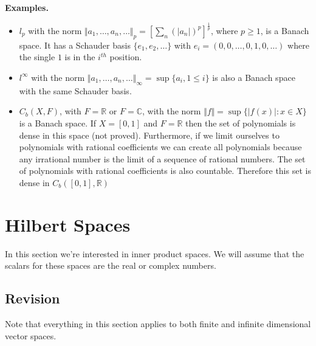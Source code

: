 \documentclass[two column]{article}
\begin{document}
{\bf Examples.}
\begin{itemize}
\item $l_{p}$ with the norm $\Vert a_{1}, \dots, a_{n}, \dots \Vert_{p} = [ \sum_{n} (\vert a_{n} \vert)^{p} ]^{\frac{1}{p}}$, where $p \geq 1$, is a Banach space. It has a Schauder basis $\{ e_{1}, e_{2}, \dots \}$ with $e_{i} = (0,0,\dots,0,1,0, \dots)$ where the single $1$ is in the $i^{th}$ position. 
\item $l^{\infty}$ with the norm $\Vert a_{1}, \dots, a_{n}, \dots \Vert_{\infty} = \sup \{a_{i}, 1 \leq i\}$ is also a Banach space with the same Schauder basis. 
\item $C_{b}(X,F)$, with $F = \mathbb{R}$ or $F=\mathbb{C}$, with the norm $\Vert f \Vert = \sup \{ \vert f(x) \vert: x \in X \}$ is a Banach space. If $X = [0,1]$ and $F = \mathbb{R}$ then the set of polynomials is dense in this space (not proved). Furthermore, if we limit ourselves to polynomials with rational coefficients we can create all polynomials because any irrational number is the limit of a sequence of rational numbers. The set of polynomials with rational coefficients is also countable. Therefore this set is dense in $C_{b}([0,1],\mathbb{R})$  
\end{itemize}

\section{Hilbert Spaces}

In this section we're interested in inner product spaces. We will assume that the scalars for these spaces are the real or complex numbers.  

\subsection{Revision}

Note that everything in this section applies to both finite and infinite dimensional vector spaces. \\ 
\end{document}
